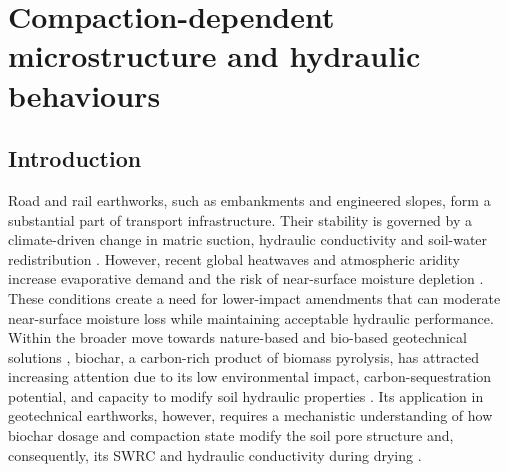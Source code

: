 \chapter{Compaction-dependent microstructure and hydraulic behaviours}
\label{chap:three}

\section{Introduction}
Road and rail earthworks, such as embankments and engineered slopes, form a substantial part of transport infrastructure. Their stability is governed by a climate-driven change in matric suction, hydraulic conductivity and soil-water redistribution \parencite{glendinningConstructionManagementMaintenance2014, rouainiaDeteriorationInfrastructureCutting2020}. However, recent global heatwaves and atmospheric aridity increase evaporative demand and the risk of near-surface moisture depletion \parencite{qingAcceleratingFlashDroughts2022}. These conditions create a need for lower-impact amendments that can moderate near-surface moisture loss while maintaining acceptable hydraulic performance. Within the broader move towards nature-based and bio-based geotechnical solutions \parencite{dejongBiogeochemicalProcessesGeotechnical2013}, biochar, a carbon-rich product of biomass pyrolysis, has attracted increasing attention due to its low environmental impact, carbon-sequestration potential, and capacity to modify soil hydraulic properties \parencite{sohiCarbonStorageBenefits2012, hussainInvestigatingUnsaturatedHydraulic2021, dingWaterRetentionCharacteristics2025}. Its application in geotechnical earthworks, however, requires a mechanistic understanding of how biochar dosage and compaction state modify the soil pore structure and, consequently, its \ac{SWRC} and hydraulic conductivity during drying \parencite{hussainInfluenceBiocharSoil2020}.\par

